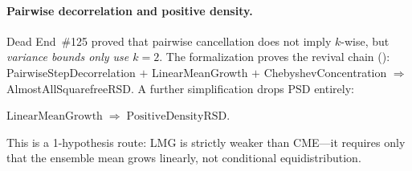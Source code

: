 \paragraph{Pairwise decorrelation and positive density.}
Dead End~\#125 proved that pairwise cancellation does not imply $k$-wise,
but \emph{variance bounds only use $k=2$}.  The formalization proves the
revival chain
():
PairwiseStepDecorrelation $+$ LinearMeanGrowth $+$
ChebyshevConcentration $\Longrightarrow$ AlmostAllSquarefreeRSD\@.
A further simplification drops PSD entirely:

\begin{theorem}
\label{thm:positive-density-rsd}
$\mathrm{LinearMeanGrowth} \;\Longrightarrow\; \mathrm{PositiveDensityRSD}$.
\end{theorem}

\noindent This is a 1-hypothesis route: LMG is strictly weaker than
CME---it requires only that the ensemble mean grows linearly, not
conditional equidistribution.


